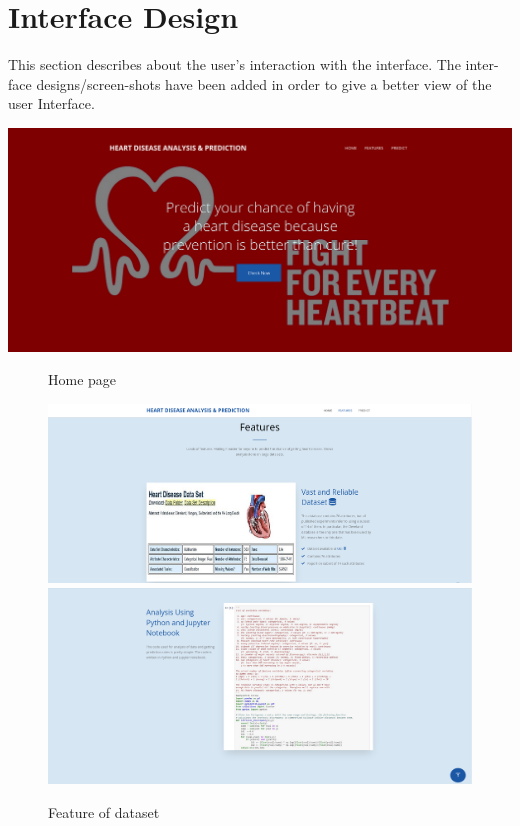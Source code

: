 \documentclass{book}
\begin{document}
    	\section{Interface Design}
    	This section describes about the user’s interaction with the interface. The inter-face designs/screen-shots have been added in order to give a better view of the user Interface.
    	
    	
    		\begin{center}
    			\includegraphics[width=17cm]{images/home.png}
    			\begin{figure}
    				\caption{Home page}
    			\end{figure}
    		\end{center}
    
    			
    			\begin{figure}
    				\begin{center}
    				\includegraphics[width=17cm]{images/features}
    				\includegraphics[width=17cm]{images/feature-analysis}
    				\caption{Feature of dataset}
    				\end{center}
    			\end{figure}
    			
\end{document}
